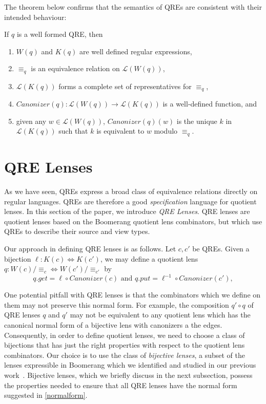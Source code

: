 \documentclass{svproc}
\newcommand{\canonizer}{\ensuremath{\mathit{Canonizer}}}
\newcommand{\eqrel}[1]{\ensuremath{\equiv_{#1}}}
\begin{document}
The theorem below confirms that the semantics of QREs are consistent with their
intended behaviour:
\begin{theorem}
If $q$ is a well formed QRE, then
\begin{enumerate}
  \item $W(q)$ and $K(q)$ are well defined regular expressions,
  \item  $\eqrel{q}$ is an equivalence relation on $\mathcal{L}(W(q))$,
  \item  $\mathcal{L}(K(q))$ forms a complete set of representatives for
  $\eqrel{q}$,
  \item $\canonizer(q):\mathcal{L}(W(q)) \longrightarrow \mathcal{L}(K(q))$ is a
  well-defined function, and
  \item  given any $w \in \mathcal{L}(W(q))$, $\canonizer(q)(w)$ is the unique
  $k$ in $\mathcal{L}(K(q))$ such that $k$ is equivalent to $w$ modulo
  $\eqrel{q}$.
  \end{enumerate}
\end{theorem}

\section{QRE Lenses}
\label{QRE-lenses} 
As we have seen, QREs express a broad class of equivalence relations
directly on regular languages.  QREs are therefore a good \textit{specification}
language for quotient lenses. In this section of the paper, we introduce
\textit{QRE Lenses}. QRE lenses are quotient lenses based on the Boomerang
quotient lens combinators, but which use QREs to describe their source and view
types.

Our approach in defining QRE lenses is as follows. Let $c, c'$ be QREs. Given a
bijection $\ell : K(c) \Leftrightarrow K(c')$, we may define a quotient lens $q
: W(c)/\eqrel{c} \Leftrightarrow W(c')/\eqrel{c'}$ by
\begin{equation}\label{normalform}
q.get = \ell \circ \canonizer(c) \text{ and } q.put = \ell^{-1} \circ
\canonizer(c'),
\end{equation}

\noindent One potential pitfall with QRE lenses is that the combinators which
we define on them may not preserve this normal form. For example, the
composition $q' \circ q$ of QRE lenses $q$ and $q'$ may not be equivalent to
any quotient lens which has the canonical normal form of a bijective lens with
canonizers a the edges. Consequently, in order to define quotient lenses, we
need to choose a class of bijections that has just the right properties with
respect to the quotient lens combinators. Our choice is to use the class of
\textit{bijective lenses}, a subset of the lenses expressible in Boomerang which
we identified and studied in our previous work~\cite{popl18}. Bijective lenses,
which we briefly discuss in the next subsection, possess the properties needed
to ensure that all QRE lenses have the normal form suggested in
\ref{normalform}.
\end{document}
